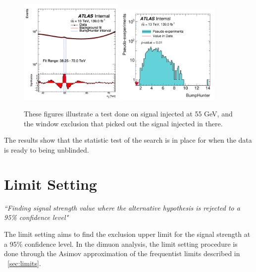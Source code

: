 \begin{figure}[!htb]
    \begin{center}
        \includegraphics[width=0.45\textwidth]{figures/chapter_dimuon/SearchBump}
        \includegraphics[width=0.45\textwidth]{figures/chapter_dimuon/bumpHunterStatPlot_bump}
        \caption{
        These figures illustrate a test done on signal injected at 55 GeV, and the window exclusion that picked out the signal injected in there.}
        \label{fig:searchbump}
    \end{center}
\end{figure}
\FloatBarrier

The results show that the statistic test of the search is in place for when the data is ready to being unblinded.

\section{Limit Setting}

\textit{``Finding signal strength value where the alternative hypothesis is rejected to a 95\% confidence level"}

The limit setting aims to find the exclusion upper limit for the signal strength at a 95\% confidence level. In the dimuon analysis, the limit setting procedure is done through the Asimov approximation of the frequentist limits described in ~\ref{sec:limits}.

